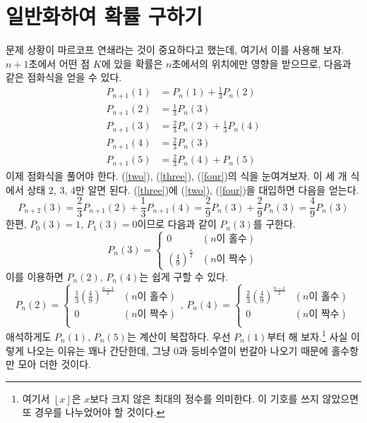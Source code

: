 \documentclass{scrartcl}
\begin{document}
\section{일반화하여 확률 구하기}
문제 상황이 마르코프 연쇄라는 것이 중요하다고 했는데, 여기서 이를 사용해 보자. \(n+1\)초에서 어떤 점 \(K\)에 있을 확률은 \(n\)초에서의 위치에만 영향을 받으므로, 다음과 같은 점화식을 얻을 수 있다.
\begin{align}
P_{n+1}(1)&=P_n(1)+\frac{1}{3}P_n(2) \\
\label{two}P_{n+1}(2)&=\frac{1}{3}P_n(3) \\
\label{three}P_{n+1}(3)&=\frac{2}{3}P_n(2)+\frac{1}{3}P_n(4) \\
\label{four}P_{n+1}(4)&=\frac{2}{3}P_n(3) \\
P_{n+1}(5)&=\frac{2}{3}P_n(4)+P_n(5)
\end{align}
이제 점화식을 풀어야 한다. (\ref{two}), (\ref{three}), (\ref{four})의 식을 눈여겨보자. 이 세 개 식에서 상태 2, 3, 4만 알면 된다. (\ref{three})에 (\ref{two}), (\ref{four})을 대입하면 다음을 얻는다.
\[P_{n+2}(3)=\frac{2}{3}P_{n+1}(2)+\frac{1}{3}P_{n+1}(4)=\frac{2}{9}P_n(3)+\frac{2}{9}P_n(3)=\frac{4}{9}P_n(3)\]
한편, \(P_0(3)=1,\,P_1(3)=0\)이므로 다음과 같이 \(P_n(3)\)를 구한다.
\[P_n(3)=\begin{cases}
           0 & (n\text{이 홀수})\\
           \left(\frac{4}{9}\right)^\frac{n}{2} & (n\text{이 짝수})
         \end{cases}
\]
이를 이용하면 \(P_n(2),\,P_n(4)\)는 쉽게 구할 수 있다.
\[P_n(2)=\begin{cases}
           \frac{1}{3}\left(\frac{4}{9}\right)^\frac{n-1}{2} & (n\text{이 홀수}) \\
           0 & (n\text{이 짝수}) \\
         \end{cases},\,P_n(4)=\begin{cases}
                                \frac{2}{3}\left(\frac{4}{9}\right)^\frac{n-1}{2} & (n\text{이 홀수}) \\
                                0 & (n\text{이 짝수}) \\
                              \end{cases}
\]
애석하게도 \(P_n(1),\,P_n(5)\)는 계산이 복잡하다. 우선 \(P_n(1)\)부터 해 보자.\footnote{여기서 \(\left\lfloor x\right\rfloor\)은 \(x\)보다 크지 않은 최대의 정수를 의미한다. 이 기호를 쓰지 않았으면 또 경우를 나누었어야 할 것이다.} 사실 이렇게 나오는 이유는 꽤나 간단한데, 그냥 0과 등비수열이 번갈아 나오기 때문에 홀수항만 모아 더한 것이다.
\end{document}
